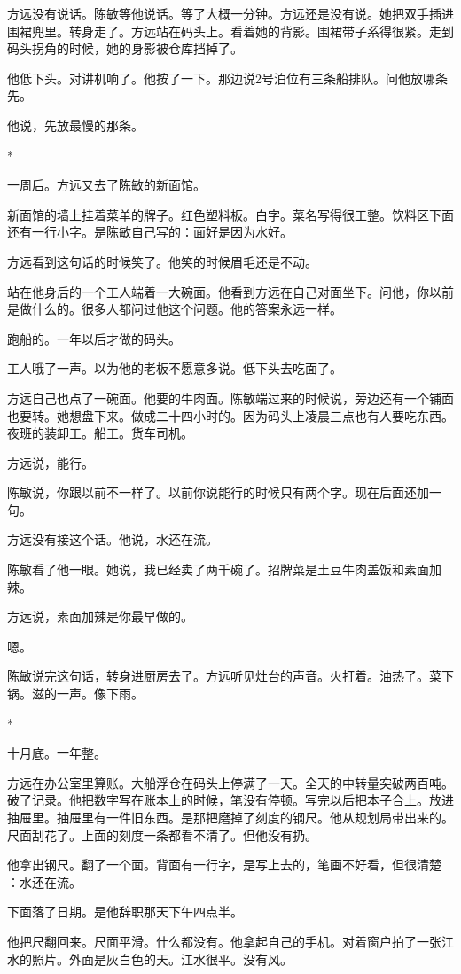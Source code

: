 \documentclass[UTF8,a5paper,11pt,openany]{ctexbook}
\newcommand{\scene}{\vspace{1em}\begin{center}*\quad*\quad*\end{center}\vspace{0.5em}}
\begin{document}
方远没有说话。陈敏等他说话。等了大概一分钟。方远还是没有说。她把双手插进围裙兜里。转身走了。方远站在码头上。看着她的背影。围裙带子系得很紧。走到码头拐角的时候，她的身影被仓库挡掉了。

他低下头。对讲机响了。他按了一下。那边说2号泊位有三条船排队。问他放哪条先。

他说，先放最慢的那条。


\scene

一周后。方远又去了陈敏的新面馆。

新面馆的墙上挂着菜单的牌子。红色塑料板。白字。菜名写得很工整。饮料区下面还有一行小字。是陈敏自己写的：面好是因为水好。

方远看到这句话的时候笑了。他笑的时候眉毛还是不动。

站在他身后的一个工人端着一大碗面。他看到方远在自己对面坐下。问他，你以前是做什么的。很多人都问过他这个问题。他的答案永远一样。

跑船的。一年以后才做的码头。

工人哦了一声。以为他的老板不愿意多说。低下头去吃面了。

方远自己也点了一碗面。他要的牛肉面。陈敏端过来的时候说，旁边还有一个铺面也要转。她想盘下来。做成二十四小时的。因为码头上凌晨三点也有人要吃东西。夜班的装卸工。船工。货车司机。

方远说，能行。

陈敏说，你跟以前不一样了。以前你说能行的时候只有两个字。现在后面还加一句。

方远没有接这个话。他说，水还在流。

陈敏看了他一眼。她说，我已经卖了两千碗了。招牌菜是土豆牛肉盖饭和素面加辣。

方远说，素面加辣是你最早做的。

嗯。

陈敏说完这句话，转身进厨房去了。方远听见灶台的声音。火打着。油热了。菜下锅。滋的一声。像下雨。


\scene

十月底。一年整。

方远在办公室里算账。大船浮仓在码头上停满了一天。全天的中转量突破两百吨。破了记录。他把数字写在账本上的时候，笔没有停顿。写完以后把本子合上。放进抽屉里。抽屉里有一件旧东西。是那把磨掉了刻度的钢尺。他从规划局带出来的。尺面刮花了。上面的刻度一条都看不清了。但他没有扔。

他拿出钢尺。翻了一个面。背面有一行字，是写上去的，笔画不好看，但很清楚 ：水还在流。

下面落了日期。是他辞职那天下午四点半。

他把尺翻回来。尺面平滑。什么都没有。他拿起自己的手机。对着窗户拍了一张江水的照片。外面是灰白色的天。江水很平。没有风。
\end{document}
